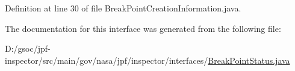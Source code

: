 Definition at line 30 of file Break\+Point\+Creation\+Information.\+java.



The documentation for this interface was generated from the following file\+:\begin{DoxyCompactItemize}
\item 
D\+:/gsoc/jpf-\/inspector/src/main/gov/nasa/jpf/inspector/interfaces/\hyperlink{_break_point_status_8java}{Break\+Point\+Status.\+java}\end{DoxyCompactItemize}
